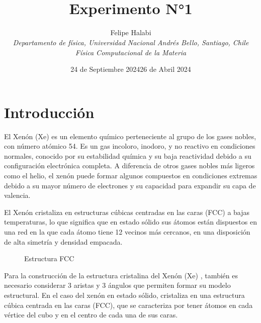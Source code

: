 \documentclass[10pt,letterpaper,twocolumn]{article}
\title{\noindent\\[-4cm]\bfseries Experimento N°1}
\author{Felipe Halabi
\\\small\itshape \textit{Departamento de física, Universidad Nacional Andrés Bello, Santiago, Chile}
\\\small\itshape Física Computacional de la Materia}
\date{24 de Septiembre 2024}
\date{26 de Abril 2024}
\begin{document}
\renewcommand{\tablename}{Tabla}
\section*{Introducción}
El Xenón (Xe) es un elemento químico perteneciente al grupo de los gases nobles, con número 
atómico 54. Es un gas incoloro, inodoro, y no reactivo en condiciones normales, conocido por 
su estabilidad química y su baja reactividad debido a su configuración electrónica completa. 
A diferencia de otros gases nobles más ligeros como el helio, el xenón puede formar algunos 
compuestos en condiciones extremas debido a su mayor número de electrones y su capacidad para 
expandir su capa de valencia.

El Xenón cristaliza en estructuras cúbicas centradas en las caras (FCC) a bajas temperaturas, 
lo que significa que en estado sólido sus átomos están dispuestos en una red en la que cada 
átomo tiene 12 vecinos más cercanos, en una disposición de alta simetría y densidad empacada.

\begin{figure}[h!]
    \centering
    
    \vspace*{-5mm}
    \caption{Estructura FCC}
\end{figure}

Para la construcción de la estructura cristalina del Xenón (Xe) \cite{}, también es necesario considerar 
3 aristas y 3 ángulos que permiten formar su modelo estructural. En el caso del xenón en estado 
sólido, cristaliza en una estructura cúbica centrada en las caras (FCC), que se caracteriza por 
tener átomos en cada vértice del cubo y en el centro de cada una de sus caras.
\end{document}
